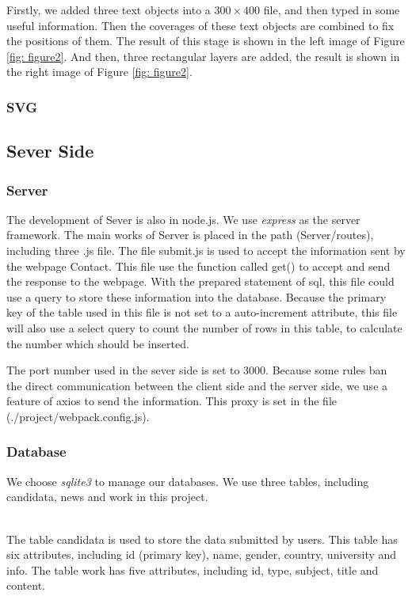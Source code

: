 \documentclass{article}
\begin{document}
\noindent
Firstly, we added three text objects into a $ 300 \times 400 $ file, and then 
typed in some useful information. Then the coverages of these text objects are
combined to fix the positions of them. The result of this stage is shown in the 
left image of Figure \ref{fig: figure2}. And then, three rectangular layers are 
added, the result is shown in the right image of Figure \ref{fig: figure2}. 



\subsubsection{SVG}

\subsection{Sever Side}
\subsubsection{Server}
The development of Sever is also in node.js. We use \textit{express} as the 
server framework. The main works of Server is placed in the path (Server/routes),
including three .js file. The file submit.js is used to accept the information 
sent by the webpage Contact. This file use the function called get() to accept and 
send the response to the webpage. With the prepared statement of sql, this file 
could use a query to store these information into the database. Because the primary
key of the table used in this file is not set to a auto-increment attribute, this
file will also use a select query to count the number of rows in this table, to 
calculate the number which should be inserted.

The port number used in the sever side is set to 3000. Because some rules ban the 
direct communication between the client side and the server side, we use a feature
of axios to send the information. This proxy is set in the file (./project/webpack.config.js).
\subsubsection{Database}
We choose \textit{sqlite3} to manage our databases. 
We use three tables, including candidata, news and work in this project.

~\\
\noindent
The table candidata is used to store the data submitted by users. This table
has six attributes, including id (primary key), name, gender, country, university
and info. The table work has five attributes, including id, type, subject, title 
and content.
\end{document}
